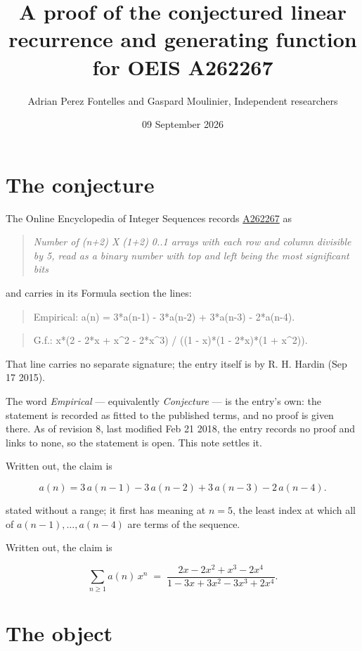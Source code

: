 \documentclass[11pt]{article}
\title{A proof of the conjectured linear recurrence and generating function for OEIS A262267}
\author{Adrian Perez Fontelles and Gaspard Moulinier, Independent researchers}
\date{09 September 2026}
\theoremstyle{definition}
\begin{document}
\maketitle
\section{The conjecture}

The Online Encyclopedia of Integer Sequences records \href{https://oeis.org/A262267}{A262267} as

\begin{quote}\itshape Number of (n+2) X (1+2) 0..1 arrays with each row and column divisible by 5, read as a binary number with top and left being the most significant bits\end{quote}

and carries in its Formula section the lines:

\begin{quote}\ttfamily Empirical: a(n) = 3*a(n-1) - 3*a(n-2) + 3*a(n-3) - 2*a(n-4).\end{quote}

\begin{quote}\ttfamily G.f.: x*(2 - 2*x + x\textasciicircum{}2 - 2*x\textasciicircum{}3) / ((1 - x)*(1 - 2*x)*(1 + x\textasciicircum{}2)).\end{quote}

That line carries no separate signature; the entry itself is by R. H. Hardin (Sep 17 2015).

The word {\itshape Empirical} --- equivalently {\itshape Conjecture} --- is the entry's own: the statement is recorded as fitted to the published terms, and no proof is given there. As of revision 8, last modified Feb 21 2018, the entry records no proof and links to none, so the statement is open. This note settles it.

Written out, the claim is

\[a(n) = 3\,a(n-1) - 3\,a(n-2) + 3\,a(n-3) - 2\,a(n-4).\]

stated without a range; it first has meaning at $n = 5$, the least index at which all of $a(n-1),\dots,a(n-4)$ are terms of the sequence.

Written out, the claim is

\[\sum_{n \ge 1} a(n)\,x^n \;=\; \frac{2x - 2x^{2} + x^{3} - 2x^{4}}{1 - 3x + 3x^{2} - 3x^{3} + 2x^{4}}.\]

\section{The object}
\end{document}
